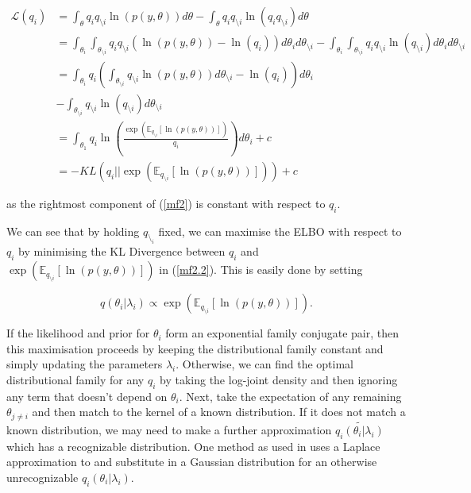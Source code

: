 \documentclass{article}\usepackage[]{graphicx}\usepackage[]{color}
\numberwithin{equation}{section}
\begin{document}
\begin{align}
\mathcal{L}(q_i) &= \int_{\theta} q_i q_{\setminus i} \ln (p(y, \theta)) d\theta - \int_{\theta} q_{i}q_{\setminus i} \ln (q_{i}q_{\setminus i}) d\theta \nonumber \\
&= \int_{\theta_i}\int_{\theta_{\setminus i}} q_{i}q_{\setminus i} ( \ln (p(y, \theta)) - \ln(q_{i})) d\theta_i d\theta_{\setminus i} - \int_{\theta_i}\int_{\theta_{\setminus i}} q_{i}q_{\setminus i} \ln (q_{\setminus i}) d\theta_i d\theta_{\setminus i}  \nonumber \\
&= \int_{\theta_{i}} q_{i} \left( \int_{\theta_{\setminus i}} q_{\setminus i} \ln (p(y, \theta )) d\theta_{\setminus i} - \ln(q_i) \right) d\theta_i \nonumber \\
&- \int_{\theta_{\setminus i}} q_{\setminus i} \ln(q_{\setminus i}) d\theta_{\setminus i} \label{mf2}\\
&= \int_{\theta_{1}} q_{i} \ln \left( \frac{\exp(  \mathbb{E}_{q_{\setminus i}} [\ln(p(y,\theta))])}{q_i} \right) d\theta_i + c \nonumber \\
&= -KL (q_i || \exp( \mathbb{E}_{q_{\setminus i}} [\ln(p(y,\theta))])) + c \label{mf2.2}
\end{align}

as the rightmost component of (\ref{mf2}) is constant with respect to $q_i$.

We can see that by holding $q_{\setminus_i}$ fixed, we can maximise the ELBO with respect to $q_i$ by minimising the KL Divergence between $q_i$ and $\exp( \mathbb{E}_{q_{\setminus i}} [\ln(p(y,\theta))])$ in (\ref{mf2.2}). This is easily done by setting

\begin{equation}
\label{mf3}
q(\theta_i | \lambda_i) \propto\exp( \mathbb{E}_{q_{\setminus i}} [\ln(p(y,\theta))]).
\end{equation}

If the likelihood and prior for $\theta_i$ form an exponential family conjugate pair, then this maximisation proceeds by keeping the distributional family constant and simply updating the parameters $\lambda_i$. Otherwise, we can find the optimal distributional family for any $q_i$ by taking the log-joint density and then ignoring any term that doesn't depend on $\theta_i$. Next, take the expectation of any remaining $\theta_{j \neq i}$ and then match to the kernel of a known distribution. If it does not match a known distribution, we may need to make a further approximation $\tilde{q_i(\theta_i|\lambda_i)}$ which has a recognizable distribution. One method as used in \citet{Friston2006} uses a Laplace approximation to and substitute in a Gaussian distribution for an otherwise unrecognizable $q_i(\theta_i | \lambda_i)$. 
\end{document}
